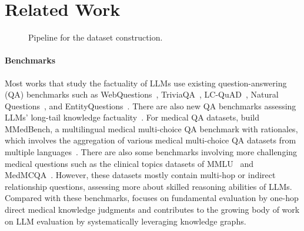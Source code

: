 \section{Related Work}

\begin{figure*}[!ht]
    \centering
    \vspace{-1em}
    \caption{Pipeline for the \mkj dataset construction.}
    \label{fig:pipeline}
    \vspace{-1em}
\end{figure*}


\paragraph{Benchmarks} Most works that study the factuality of LLMs use existing question-answering (QA) benchmarks such as WebQuestions~\cite{berant2013semantic}, TriviaQA~\cite{joshi2017triviaqa}, LC-QuAD~\cite{trivedi2017lc, dubey2019lc}, Natural Questions~\cite{kwiatkowski2019natural}, and EntityQuestions~\cite{sciavolino2021simple}. 
There are also new QA benchmarks assessing LLMs' long-tail knowledge factuality~\cite{mallen2023not, kumar2024automatic}. 
For medical QA datasets, \citet{qiu2024towards} build MMedBench, a multilingual medical multi-choice QA benchmark with rationales, which involves the aggregation of various medical multi-choice QA datasets from multiple languages~\cite{jin2021disease, kasai2023evaluating, labrak-etal-2022-frenchmedmcqa, vilares-gomez-rodriguez-2019-head, blinov2022rumedbench}. 
There are also some benchmarks involving more challenging medical questions such as the clinical topics datasets of MMLU~\cite{hendrycks2020measuring} and MedMCQA~\cite{pal2022medmcqa, malaviya-etal-2024-expertqa}. However, these datasets mostly contain multi-hop or indirect relationship questions, assessing more about skilled reasoning abilities of LLMs.
Compared with these benchmarks, \mkj{} focuses on fundamental evaluation by one-hop direct medical knowledge judgments and contributes to the growing body of work on LLM evaluation by systematically leveraging knowledge graphs.




